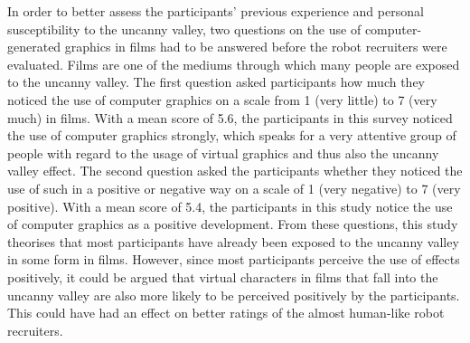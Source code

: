 In order to better assess the participants' previous experience and personal susceptibility to the uncanny valley, two questions on the use of computer-generated graphics in films had to be answered before the robot recruiters were evaluated. Films are one of the mediums through which many people are exposed to the uncanny valley. The first question asked participants how much they noticed the use of computer graphics on a scale from 1 (very little) to 7 (very much) in films. With a mean score of 5.6, the participants in this survey noticed the use of computer graphics strongly, which speaks for a very attentive group of people with regard to the usage of virtual graphics and thus also the uncanny valley effect. The second question asked the participants whether they noticed the use of such in a positive or negative way on a scale of 1 (very negative) to 7 (very positive). With a mean score of 5.4, the participants in this study notice the use of computer graphics as a positive development. From these questions, this study theorises that most participants have already been exposed to the uncanny valley in some form in films. However, since most participants perceive the use of effects positively, it could be argued that virtual characters in films that fall into the uncanny valley are also more likely to be perceived positively by the participants. This could have had an effect on better ratings of the almost human-like robot recruiters.

